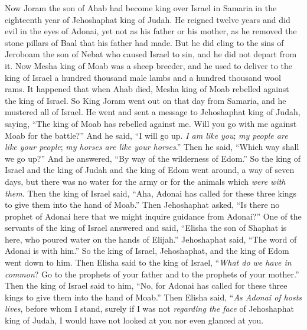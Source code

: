 \begin{biblechapter} %
 Now Joram the son of Ahab had become king over Israel in Samaria in the eighteenth year of Jehoshaphat king of Judah. He reigned twelve years
\verse and did evil in the eyes of Adonai, yet not as his father or his mother, as he removed the stone pillars of Baal that his father had made.
\verse But he did cling to the sins of Jeroboam the son of Nebat who caused Israel to sin, and he did not depart from it.
\verse Now Mesha king of Moab was a sheep breeder, and he used to deliver to the king of Israel a hundred thousand male lambs and a hundred thousand wool rams.
\verse It happened that when Ahab died, Mesha king of Moab rebelled against the king of Israel.
\verse So King Joram went out on that day from Samaria, and he mustered all of Israel.
\verse He went and sent a message to Jehoshaphat king of Judah, saying, “The king of Moab has rebelled against me. Will you go with me against Moab for the battle?” And he said, “I will go up. \textit{I am like you}; \textit{my people are like your people}; \textit{my horses are like your horses}.”
\verse Then he said, “Which way shall we go up?” And he answered, “By way of the wilderness of Edom.”
\verse So the king of Israel and the king of Judah and the king of Edom went around, a way of seven days, but there was no water for the army or for the animals which \textit{were with them}.
\verse Then the king of Israel said, “Aha, Adonai has called for these three kings to give them into the hand of Moab.”
\verse Then Jehoshaphat asked, “Is there no prophet of Adonai here that we might inquire guidance from Adonai?” One of the servants of the king of Israel answered and said, “Elisha the son of Shaphat is here, who poured water on the hands of Elijah.”
\verse Jehoshaphat said, “The word of Adonai is with him.” So the king of Israel, Jehoshaphat, and the king of Edom went down to him.
\verse Then Elisha said to the king of Israel, “\textit{What do we have in common}? Go to the prophets of your father and to the prophets of your mother.” Then the king of Israel said to him, “No, for Adonai has called for these three kings to give them into the hand of Moab.”
\verse Then Elisha said, “\textit{As Adonai of hosts lives}, before whom I stand, surely if I was not \textit{regarding the face} of Jehoshaphat king of Judah, I would have not looked at you nor even glanced at you.

\end{biblechapter}
